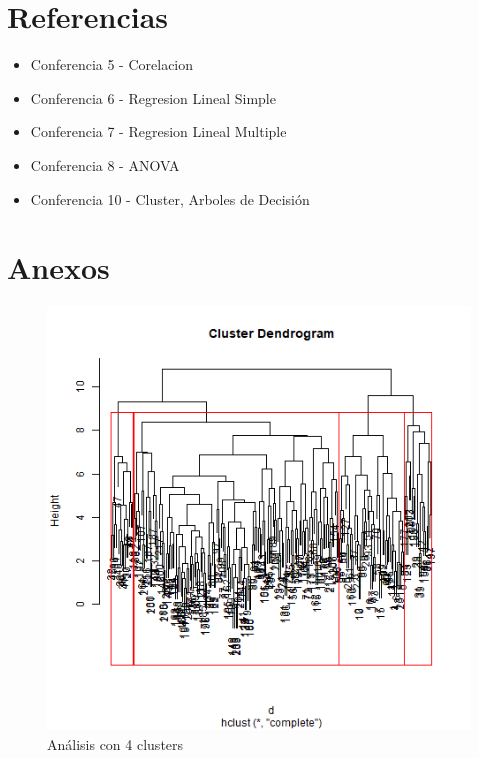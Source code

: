 \documentclass[a4paper,10pt,twocolumn]{article}
\begin{document}
\section{Referencias}\label{sec:ref}

\begin{itemize}
	\item Conferencia 5 - Corelacion
	\item Conferencia 6 - Regresion Lineal Simple
	\item Conferencia 7 - Regresion Lineal Multiple
	\item Conferencia 8 - ANOVA
	\item Conferencia 10 - Cluster, Arboles de Decisión
\end{itemize}

\newpage

\section{Anexos}\label{sec:anexos}

\begin{figure}[htb]%
	\begin{center}
		\includegraphics[width=\linewidth]{hier_cluster_4_euclidean}
	\end{center}
	\caption{Análisis con 4 clusters \label{fig:hier_cluster_4_euclidean}}%
\end{figure}
\end{document}
